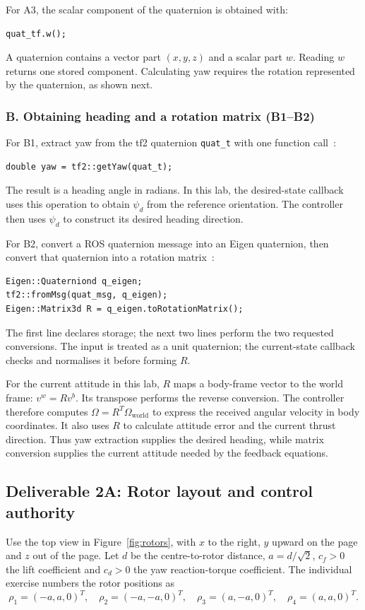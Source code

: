 \documentclass[12pt,a4paper,twoside]{article}
\begin{document}
For A3, the scalar component of the quaternion is obtained with:
\begin{lstlisting}
quat_tf.w();
\end{lstlisting}
A quaternion contains a vector part $(x,y,z)$ and a scalar part $w$. Reading $w$ returns one stored component. Calculating yaw requires the rotation represented by the quaternion, as shown next.

\subsubsection*{B. Obtaining heading and a rotation matrix (B1--B2)}
For B1, extract yaw from the tf2 quaternion \texttt{quat\_t} with one function call~\citep{rosutils}:
\begin{lstlisting}
double yaw = tf2::getYaw(quat_t);
\end{lstlisting}
The result is a heading angle in radians. In this lab, the desired-state callback uses this operation to obtain $\psi_d$ from the reference orientation. The controller then uses $\psi_d$ to construct its desired heading direction.

For B2, convert a ROS quaternion message into an Eigen quaternion, then convert that quaternion into a rotation matrix~\citep{roseigen}:
\begin{lstlisting}
Eigen::Quaterniond q_eigen;
tf2::fromMsg(quat_msg, q_eigen);
Eigen::Matrix3d R = q_eigen.toRotationMatrix();
\end{lstlisting}
The first line declares storage; the next two lines perform the two requested conversions. The input is treated as a unit quaternion; the current-state callback checks and normalises it before forming $R$.

For the current attitude in this lab, $R$ maps a body-frame vector to the world frame: $v^w=Rv^b$. Its transpose performs the reverse conversion. The controller therefore computes $\Omega=R^T\Omega_{\mathrm{world}}$ to express the received angular velocity in body coordinates. It also uses $R$ to calculate attitude error and the current thrust direction. Thus yaw extraction supplies the desired heading, while matrix conversion supplies the current attitude needed by the feedback equations.

\subsection{Deliverable 2A: Rotor layout and control authority}
Use the top view in Figure~\ref{fig:rotors}, with $x$ to the right, $y$ upward on the page and $z$ out of the page. Let $d$ be the centre-to-rotor distance, $a=d/\sqrt{2}$, $c_f>0$ the lift coefficient and $c_d>0$ the yaw reaction-torque coefficient. The individual exercise numbers the rotor positions as
\begin{equation}
 \rho_1=(-a,a,0)^T,\quad \rho_2=(-a,-a,0)^T,\quad
 \rho_3=(a,-a,0)^T,\quad \rho_4=(a,a,0)^T.
\end{equation}
\end{document}
